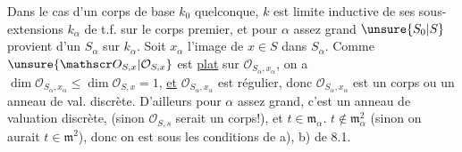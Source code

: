 Dans le cas d'un corps de base $k_0$ quelconque, $k$  est limite inductive de ses sous-extensions $k_\alpha$ de t.f. sur le corps premier, et pour $\alpha$ assez grand $\unsure{S_0|S}$ provient d'un $S_\alpha$ sur $k_\alpha$. Soit $x_\alpha$ l'image de $x\in S$ dans $S_\alpha$. Comme $\unsure{\mathscr O_{S,x}|\mathcal O_{S,x}}$ est \uline{plat} sur $\mathscr O_{S_\alpha,x_\alpha}$, on a $\dim\mathscr O_{S_\alpha,x_\alpha}\leq\dim\mathscr O_{S,x}=1$, \uline{et} $\mathscr O_{S_\alpha,x_\alpha}$ est régulier, donc $\mathscr O_{S_\alpha,x_\alpha}$ est un corps ou  un anneau de val. discrète.
D'ailleurs pour $\alpha$ assez grand, c'est un anneau de valuation discrète,  (sinon $\mathscr O_{S,s}$ serait un corps!),  et $t\in\mathfrak m_\alpha$.  $t\notin\mathfrak m_\alpha^2$ (sinon on aurait $t\in\mathfrak m^2$), donc on est sous les conditions de a), b) de 8.1.
